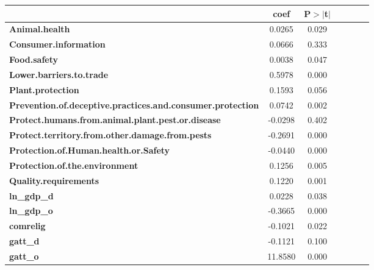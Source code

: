 \begin{table}
\begin{center}
\begin{tabular}{lcccccc}
                                                                   & \textbf{coef} & \textbf{P$> |$t$|$}\\
\midrule
\textbf{Animal.health}                                             &       0.0265  &         0.029       \\
\textbf{Consumer.information}                                      &       0.0666  &         0.333       \\
\textbf{Food.safety}                                               &       0.0038  &         0.047       \\
\textbf{Lower.barriers.to.trade}                                   &       0.5978  &         0.000       \\
\textbf{Plant.protection}                                          &       0.1593  &         0.056       \\
\textbf{Prevention.of.deceptive.practices.and.consumer.protection} &       0.0742  &         0.002       \\
\textbf{Protect.humans.from.animal.plant.pest.or.disease}          &      -0.0298  &         0.402       \\
\textbf{Protect.territory.from.other.damage.from.pests}            &      -0.2691  &         0.000       \\
\textbf{Protection.of.Human.health.or.Safety}                      &      -0.0440  &         0.000       \\
\textbf{Protection.of.the.environment}                             &       0.1256  &         0.005       \\
\textbf{Quality.requirements}                                      &       0.1220  &         0.001       \\
\textbf{ln\_gdp\_d}                                                &       0.0228  &         0.038       \\
\textbf{ln\_gdp\_o}                                                &      -0.3665  &         0.000       \\
\textbf{comrelig}                                                  &      -0.1021  &         0.022       \\
\textbf{gatt\_d}                                                   &      -0.1121  &         0.100       \\
\textbf{gatt\_o}                                                   &      11.8580  &         0.000       \\

\end{tabular}
\end{center}
\end{table}
